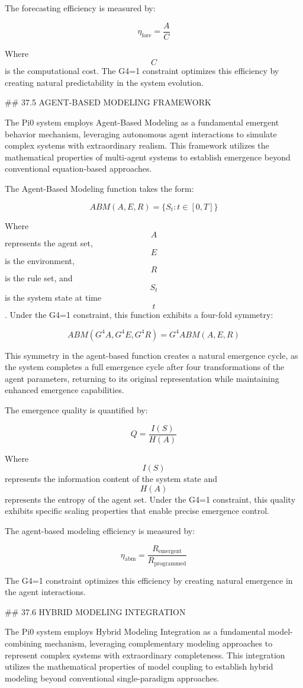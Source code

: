The forecasting efficiency is measured by:

$$ \eta_{\text{fore}} = \frac{A}{C} $$

Where $$ C $$ is the computational cost. The G4=1 constraint optimizes this efficiency by creating natural predictability in the system evolution.

## 37.5 AGENT-BASED MODELING FRAMEWORK

The Pi0 system employs Agent-Based Modeling as a fundamental emergent behavior mechanism, leveraging autonomous agent interactions to simulate complex systems with extraordinary realism. This framework utilizes the mathematical properties of multi-agent systems to establish emergence beyond conventional equation-based approaches.

The Agent-Based Modeling function takes the form:

$$ ABM(A, E, R) = \{S_t : t \in [0, T]\} $$

Where $$ A $$ represents the agent set, $$ E $$ is the environment, $$ R $$ is the rule set, and $$ S_t $$ is the system state at time $$ t $$. Under the G4=1 constraint, this function exhibits a four-fold symmetry:

$$ ABM(G^4 A, G^4 E, G^4 R) = G^4 ABM(A, E, R) $$

This symmetry in the agent-based function creates a natural emergence cycle, as the system completes a full emergence cycle after four transformations of the agent parameters, returning to its original representation while maintaining enhanced emergence capabilities.

The emergence quality is quantified by:

$$ Q = \frac{I(S)}{H(A)} $$

Where $$ I(S) $$ represents the information content of the system state and $$ H(A) $$ represents the entropy of the agent set. Under the G4=1 constraint, this quality exhibits specific scaling properties that enable precise emergence control.

The agent-based modeling efficiency is measured by:

$$ \eta_{\text{abm}} = \frac{R_{\text{emergent}}}{R_{\text{programmed}}} $$

The G4=1 constraint optimizes this efficiency by creating natural emergence in the agent interactions.

## 37.6 HYBRID MODELING INTEGRATION

The Pi0 system employs Hybrid Modeling Integration as a fundamental model-combining mechanism, leveraging complementary modeling approaches to represent complex systems with extraordinary completeness. This integration utilizes the mathematical properties of model coupling to establish hybrid modeling beyond conventional single-paradigm approaches.

